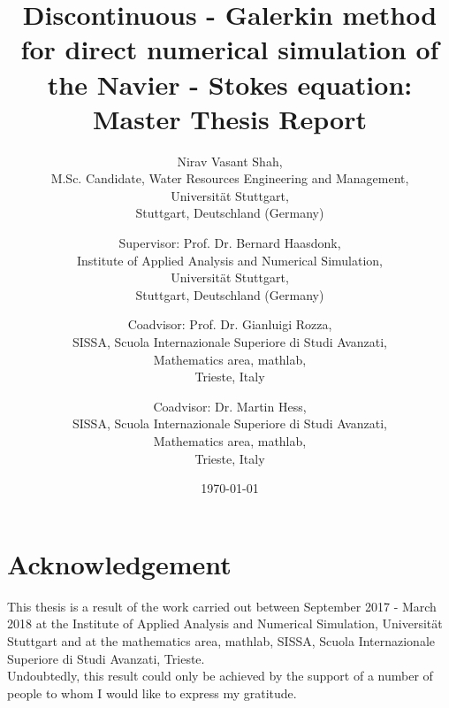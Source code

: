 \documentclass[a4paper,twoside,openright]{book}
\begin{document}
\begin{titlepage}

\title{Discontinuous - Galerkin method for direct numerical simulation of the Navier - Stokes equation: Master Thesis Report}


\author{Nirav Vasant Shah, \\M.Sc. Candidate, Water Resources Engineering and Management, \\Universit\"at Stuttgart, \\Stuttgart, Deutschland (Germany)\\ 
\and Supervisor: Prof. Dr. Bernard Haasdonk,\\ Institute of Applied Analysis and Numerical Simulation, \\Universit\"at Stuttgart,\\ Stuttgart, Deutschland (Germany)\\ \and Coadvisor: Prof. Dr. Gianluigi Rozza,\\ SISSA, Scuola Internazionale Superiore di Studi Avanzati, \\Mathematics area, mathlab, \\Trieste, Italy \\ \and Coadvisor: Dr. Martin Hess,\\ SISSA, Scuola Internazionale Superiore di Studi Avanzati, \\Mathematics area, mathlab,  \\Trieste, Italy }
\date{\today}
\maketitle


\end{titlepage}

\noindent

\section{Acknowledgement}

This thesis is a result of the work carried out between September 2017 - March 2018 at the Institute of Applied Analysis and Numerical Simulation, Universit\"at Stuttgart and at the mathematics area, mathlab, SISSA, Scuola Internazionale Superiore di Studi Avanzati, Trieste. \\

Undoubtedly, this result could only be achieved by the support of a number of people to whom I would like to express my gratitude.\\
\end{document}
